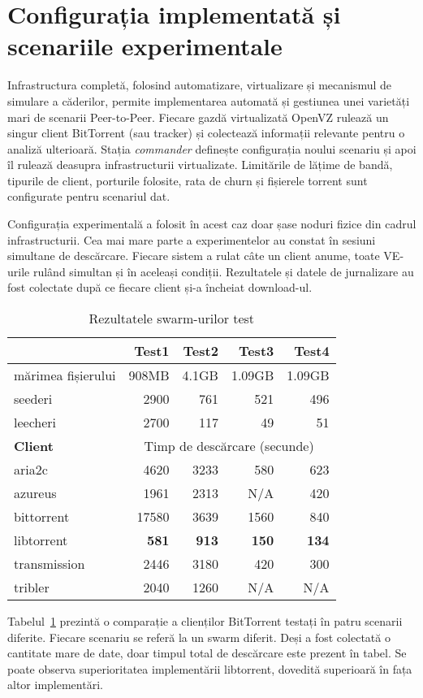 \section{Configurația implementată și scenariile experimentale}
\label{sec:virt-infra:setup-scenarios}

Infrastructura completă, folosind automatizare, virtualizare și mecanismul
de simulare a căderilor, permite implementarea automată și gestiunea
unei varietăți mari de scenarii Peer-to-Peer. Fiecare gazdă virtualizată
OpenVZ rulează un singur client BitTorrent (sau tracker) și colectează
informații relevante pentru o analiză ulterioară. Stația \textit{commander}
definește configurația noului scenariu și apoi îl rulează deasupra
infrastructurii virtualizate. Limitările de lățime de bandă, tipurile
de client, porturile folosite, rata de churn și fișierele torrent sunt
configurate pentru scenariul dat.

Configurația experimentală a folosit în acest caz doar șase noduri fizice
din cadrul infrastructurii. Cea mai mare parte a experimentelor au constat
în sesiuni simultane de descărcare. Fiecare sistem a rulat câte un client
anume, toate VE-urile rulând simultan și în aceleași condiții. Rezultatele
și datele de jurnalizare au fost colectate după ce fiecare client și-a
încheiat download-ul.

\begin{table}[ht]
  \centering
  \begin{tabular}{@{}lrrrr@{}}
    \toprule
    & \textbf{Test1} & \textbf{Test2} & \textbf{Test3} &
    \textbf{Test4} \\
    \midrule
    mărimea fișierului & 908MB & 4.1GB & 1.09GB & 1.09GB	\\
    seederi & 2900 & 761 & 521 & 496	\\
    leecheri & 2700 & 117 & 49 & 51	\\
    \midrule
    \textbf{Client} & \multicolumn{4}{c}{Timp de descărcare (secunde)} \\
    \midrule
    aria2c & 4620 & 3233 & 580 & 623 \\
    azureus & 1961 & 2313 & N/A & 420 \\
    bittorrent & 17580 & 3639 & 1560 & 840 \\
    libtorrent & \textbf{581} & \textbf{913} & \textbf{150} & \textbf{134} \\
    transmission & 2446 & 3180 & 420 & 300 \\
    tribler & 2040 & 1260 & N/A & N/A \\
    \bottomrule
  \end{tabular}
  \caption{Rezultatele swarm-urilor test}
  \label{table:virt-infra:testsw}
\end{table}

Tabelul~\ref{table:virt-infra:testsw} prezintă o comparație a clienților
BitTorrent testați în patru scenarii diferite. Fiecare scenariu se referă
la un swarm diferit. Deși a fost colectată o cantitate mare de date, doar
timpul total de descărcare este prezent în tabel. Se poate observa
superioritatea implementării libtorrent, dovedită superioară în fața altor
implementări.
